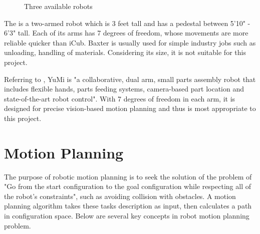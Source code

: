 \begin{figure}[H]
\centering
{}
\caption{Three available robots}
\label{robot}
\end{figure}

The \citep{baxter} is a two-armed robot which is 3 feet tall and has a pedestal between 5'10" - 6'3" tall. Each of its arms has 7 degrees of freedom, whose movements are more reliable quicker than iCub. Baxter is usually used for simple industry jobs such as unloading, handling of materials. Considering its size, it is not suitable for this project. 

Referring to \citep{ABBsDual5:online}, YuMi is "a collaborative, dual arm, small parts assembly robot that includes flexible hands, parts feeding systems, camera-based part location and state-of-the-art robot control". With 7 degrees of freedom in each arm, it is designed for precise vision-based motion planning and thus is most appropriate to this project.

\section{Motion Planning} \label{backgroundmp}
The purpose of robotic motion planning is to seek the solution of the problem of "Go from the start configuration to the goal configuration while respecting all of the robot's constraints", such as avoiding collision with obstacles. A motion planning algorithm takes these tasks description as input, then calculates a path in configuration space. Below are several key concepts in robot motion planning problem.

